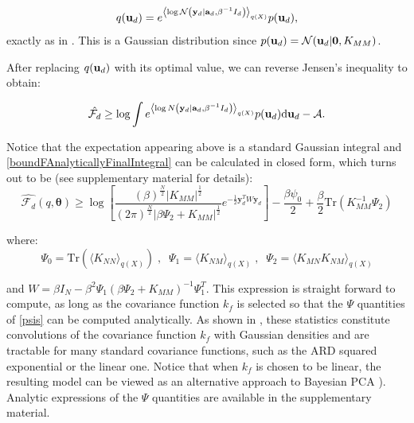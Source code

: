 \documentclass [10pt , a4paper]{article}
\begin{document}
\begin{equation}
\label{qu}
q(\mathbf{u}_d) = e^{\left\langle \log \mathcal{N} \left( \mathbf{y}_d | \mathbf{a}_d, \beta^{-1} I_d \right) \right\rangle_{q(X)}}
		p(\mathbf{u}_d) ,
\end{equation}
exactly as in \cite{BayesianGPLVM}. This is a Gaussian distribution since 
$p(\mathbf{u}_d ) = \mathcal{N} (\mathbf{u}_d | \mathbf{0}, K_{MM} )$.

\par After replacing $q(\mathbf{u}_d)$ with its optimal value, we can reverse Jensen's inequality to obtain:

\begin{equation}
\label{boundFAnalyticallyFinalIntegral}
\hat{\mathcal{F}_d} \geq
	\log \int e^{\left\langle \log N \left( \mathbf{y}_d | \mathbf{a}_d, \beta^{-1} I_d \right) \right\rangle_{q(X)}}
		p(\mathbf{u}_d) \text{d} \mathbf{u}_d -\mathcal{A} .
\end{equation}

\noindent Notice that the expectation appearing above is a standard Gaussian integral and \eqref{boundFAnalyticallyFinalIntegral} can
be calculated in closed form, which turns out to be (see supplementary material for details):
\begin{equation}
\label{FdFinal}
\hat{\mathcal{F}_d}(q, \boldsymbol \theta) \geq \log \left[ 
	\frac{(\beta)^{\frac{N}{2}} \vert \mathit{K_{MM}} \vert ^\frac{1}{2} }
		 {(2\pi)^{\frac{N}{2}} \vert \beta \Psi_2 + \mathit{K_{MM}}  \vert ^\frac{1}{2} } 
	 e^{-\frac{1}{2} \mathbf{y}^{T}_{d} W \mathbf{y}_d}
	 \right]	 -
	 \frac{\beta \psi_0}{2} + \frac{\beta}{2} 
	 \text{Tr} \left( \mathit{K_{MM}^{-1}} \Psi_2 \right)	
\end{equation}

\noindent where:
\begin{equation}
\label{psis}
\Psi_0 = \text{Tr}(\langle \mathit{K_{NN}} \rangle_{q(\mathit{X})}) \;, \;\;
\Psi_1 = \langle \mathit{K_{NM}} \rangle_{q(\mathit{X})} \;, \;\;
\Psi_2 = \langle \mathit{K_{MN}} \mathit{K_{NM}} \rangle_{q(\mathit{X})}
\end{equation}

\noindent and $W = \beta I_N - \beta^2 \Psi_1 (\beta \Psi_2 + K_{MM})^{-1} \Psi_1^T$. This expression is straight forward to compute, as long as the covariance function $k_f$
 is selected so that the $\Psi$ quantities of \eqref{psis} can be computed analytically. As shown in \cite{BayesianGPLVM}, these
statistics constitute convolutions of the covariance function $k_f$ with Gaussian densities and 
are tractable for many standard covariance functions, such as the ARD squared exponential or the linear one.
Notice that when $k_f$ is
chosen to be linear, the resulting model can be viewed as an alternative approach to Bayesian PCA \cite{BayesianPCA}).
Analytic expressions of the $\Psi$ quantities are available in the supplementary material.
\end{document}
